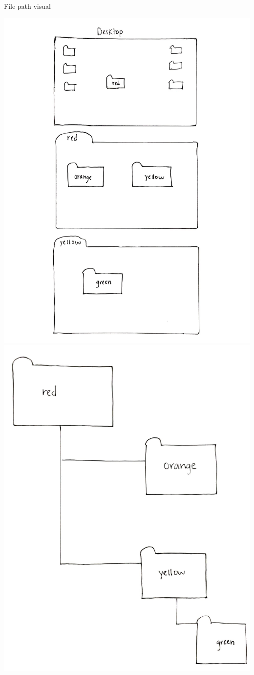 \documentclass[8pt,ignorenonframetext,dvipsnames]{beamer}
\begin{document}
\begin{frame}{File path visual}

\includegraphics{fp1.JPG} \includegraphics{fp2.JPG}


\end{frame}
\end{document}
